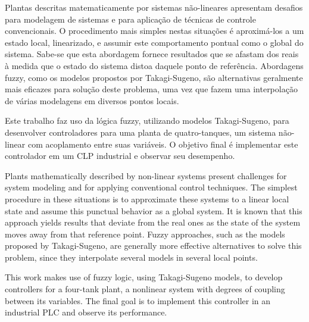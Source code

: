 %
{
	\indent Plantas descritas matematicamente por sistemas não-lineares apresentam desafios para modelagem de sistemas e para aplicação de técnicas de controle convencionais. O procedimento mais simples nestas situações é aproximá-los a um estado local, linearizado, e assumir este comportamento pontual como o global do sistema. Sabe-se que esta abordagem fornece resultados que se afastam dos reais à medida que o estado do sistema distoa daquele ponto de referência. Abordagens fuzzy, como os modelos propostos por Takagi-Sugeno, são alternativas geralmente mais eficazes para solução deste problema, uma vez que fazem uma interpolação de várias modelagens em diversos pontos locais.
	
	Este trabalho faz uso da lógica fuzzy, utilizando modelos Takagi-Sugeno, para desenvolver controladores para uma planta de quatro-tanques, um sistema não-linear com acoplamento entre suas variáveis. O objetivo final é implementar este controlador em um CLP industrial e observar seu desempenho.
}
\vspace*{2cm}
{
	\indent Plants mathematically described by non-linear systems present challenges for system modeling and for applying conventional control techniques. The simplest procedure in these situations is to approximate these systems to a linear local state and assume this punctual behavior as a global system. It is known that this approach yields results that deviate from the real ones as the state of the system moves away from that reference point. Fuzzy approaches, such as the models proposed by Takagi-Sugeno, are generally more effective alternatives to solve this problem, since they interpolate several models in several local points.
	
	This work makes use of fuzzy logic, using Takagi-Sugeno models, to develop controllers for a four-tank plant, a nonlinear system with degrees of coupling between its variables. The final goal is to implement this controller in an industrial PLC and observe its performance.
}%

